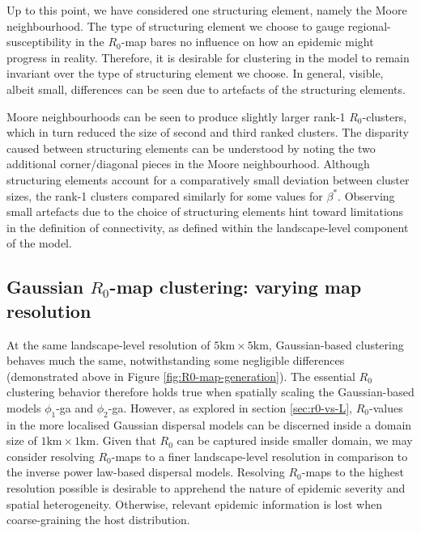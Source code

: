Up to this point, we have considered one structuring element, namely the Moore neighbourhood.
The type of structuring element we choose to gauge regional-susceptibility in the $R_0$-map bares no influence on how an epidemic might progress in reality.
Therefore, it is desirable for clustering in the model to remain invariant over the type of structuring element we choose.
In general, visible, albeit small, differences can be seen due to artefacts of the structuring elements.

Moore neighbourhoods can be seen to produce slightly larger rank-1 $R_0$-clusters, which in turn reduced the size of second and third ranked clusters.
The disparity caused between structuring elements can be understood by noting the two additional corner/diagonal pieces in the Moore neighbourhood.
Although structuring elements account for a comparatively small deviation between cluster sizes, the rank-1 clusters compared similarly for some values for $\beta^*$.
Observing small artefacts due to the choice of structuring elements hint toward limitations in the definition of connectivity, as defined within the landscape-level component of the model.

\subsection{Gaussian $R_0$-map clustering: varying map resolution}
\label{sec:gaussian-r0-clustering}

At the same landscape-level resolution of $\mathrm{5km \times 5km}$, Gaussian-based clustering behaves much the same, notwithstanding some negligible differences (demonstrated above in Figure \ref{fig:R0-map-generation}).
The essential $R_0$ clustering behavior therefore holds true when spatially scaling the Gaussian-based models $\phi_1$-ga and $\phi_2$-ga.
However, as explored in section \ref{sec:r0-vs-L}, $R_0$-values in the more localised Gaussian dispersal models can be discerned inside a domain size of $\mathrm{1km \times 1km}$.
Given that $R_0$ can be captured inside smaller domain, we may consider resolving $R_0$-maps to a finer landscape-level resolution in comparison to the inverse power law-based dispersal models.
Resolving $R_0$-maps to the highest resolution possible is desirable to apprehend the nature of epidemic severity and spatial heterogeneity.
Otherwise, relevant epidemic information is lost when coarse-graining the host distribution. 

